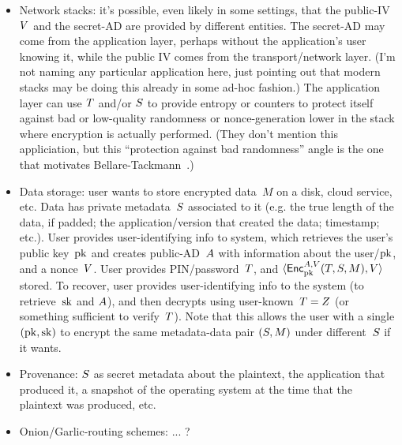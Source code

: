 \begin{itemize}
%
\item Network stacks: it's possible, even likely in some settings, that the public-IV~$V$ and the secret-AD are provided by different entities.  The secret-AD may come from the application layer, perhaps without the application's user knowing it, while the public IV comes from the transport/network layer. (I'm not naming any particular application here, just pointing out that modern stacks may be doing this already in some ad-hoc fashion.)  The application layer can use $T$ and/or $S$ to provide entropy or counters to protect itself against bad or low-quality randomness or nonce-generation lower in the stack where encryption is actually performed. (They don't mention this appliciation, but this ``protection against bad randomness'' angle is the one that motivates Bellare-Tackmann~\cite{BellareTackmann}.)
%
\item Data storage: user wants to store encrypted data~$M$ on a disk, cloud service, etc.  Data has private metadata~$S$ associated to it (e.g. the true length of the data, if padded; the application/version that created the data; timestamp; etc.).  User provides user-identifying info to system, which retrieves the user's public key~$\mathrm{pk}$ and creates public-AD~$A$ with information about the user/$\mathrm{pk}$, and a nonce~$V$.  User provides PIN/password~$T$, and $\langle {\mathsf{Enc}}_{\mathrm{pk}}^{A,V}(T,S,M), V\rangle$ stored.  To recover, user provides user-identifying info to the system (to retrieve~$\mathrm{sk}$ and $A$), and then decrypts using user-known~$T=Z$ (or something sufficient to verify~$T$).  Note that this allows the user with a single $(\mathrm{pk},\mathrm{sk})$ to encrypt the same metadata-data pair $(S,M)$ under different~$S$ if it wants. 
%
\item Provenance: $S$ as secret metadata about the plaintext, the application that produced it, a snapshot of the operating system at the time that the plaintext was produced, etc. 
%
\item Onion/Garlic-routing schemes: ... ? 

\end{itemize}
